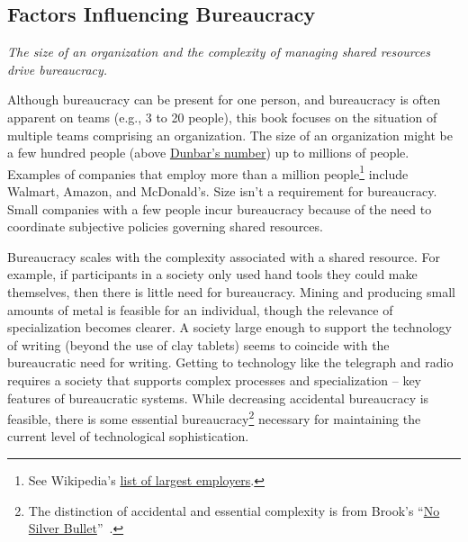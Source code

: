 \subsection*{Factors Influencing Bureaucracy}

\textit{The size of an organization and the complexity of managing shared resources drive bureaucracy.}

Although bureaucracy can be present for one person, and bureaucracy is often apparent on teams (e.g., 3 to 20 people), this book focuses on the situation of multiple teams comprising an organization. The size of an organization might be a few hundred people (above \href{https://en.wikipedia.org/wiki/Dunbar's_number}{Dunbar's number})\iftoggle{WPinmargin}{\marginpar{$>$Wikipedia: Dunbar's number}}{}
 up to millions of people. 
Examples of companies that employ more than a million people\footnote{See Wikipedia's \href{https://en.wikipedia.org/wiki/List_of_largest_employers}{list of largest employers}.
} include Walmart, Amazon, and McDonald's. Size isn't a requirement for bureaucracy. Small companies with a few people incur bureaucracy because of the need to coordinate subjective policies governing shared resources. 


Bureaucracy scales with the complexity associated with a shared resource. For example, if participants in a society only used hand tools they could make themselves, then there is little need for bureaucracy. Mining and producing small amounts of metal is feasible for an individual, though the relevance of specialization becomes clearer. A society large enough to support the technology of writing (beyond the use of clay tablets) seems to coincide with the bureaucratic need for writing. Getting to technology like the telegraph and radio requires a society that supports complex processes and specialization -- key features of bureaucratic systems. While decreasing accidental bureaucracy is feasible, there is some essential bureaucracy\footnote{The distinction of accidental and essential complexity is from Brook's 
``\href{https://en.wikipedia.org/wiki/No_Silver_Bullet\%23Summary}{No Silver Bullet}''~\cite{1986_brooks}.
}
necessary for maintaining the current level of technological sophistication. 

